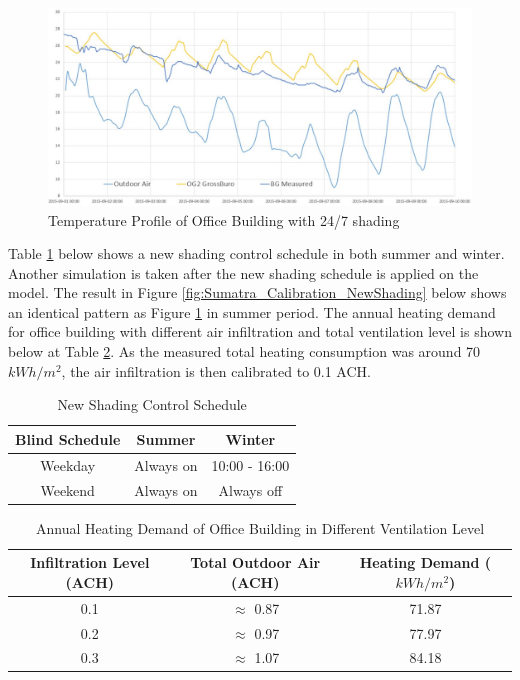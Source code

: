 \documentclass[a4paper, oneside]{discothesis}
\begin{document}
			\begin{figure}[h!]
			\centering
			\includegraphics[scale=0.3]{Sumatra_Calibration_AllonShading.JPG}
			\caption{Temperature Profile of Office Building with 24/7 shading}
			\label{fig:Sumatra_Calibration_Allshade}
			\end{figure}			
			
			Table \ref{tab:HonggShadingCtrl} below shows a new shading control schedule in both summer and winter. Another simulation is taken after the new shading schedule is applied on the model. The result in Figure \ref{fig:Sumatra_Calibration_NewShading} below shows an identical pattern as Figure \ref{fig:Sumatra_Calibration_Allshade} in summer period. The annual heating demand for office building with different air infiltration and total ventilation level is shown below at Table \ref{tab:SumatraVentLevel}. As the measured total heating consumption was around 70 $kWh/m^2$, the air infiltration is then calibrated to 0.1 ACH.\\
			
		\begin{table}[htbp]
		\centering
		\caption{New Shading Control Schedule}
		    \begin{tabular}{ccc}
		    \toprule
		    Blind Schedule & Summer & Winter\\
		    \midrule
            Weekday & Always on & 10:00 - 16:00 \\
            Weekend & Always on & Always off\\
		    \bottomrule
		    \end{tabular}%
		  \label{tab:HonggShadingCtrl}%
		\end{table}%
            
            
		\begin{table}[htbp]
		\centering
		\caption{Annual Heating Demand of Office Building in Different Ventilation Level}
		    \begin{tabular}{ccc}
		    \toprule
		    Infiltration Level (ACH) & Total Outdoor Air (ACH) & Heating Demand ($kWh/m^2$)\\
		    \midrule
            0.1 & $\approx$ 0.87 & 71.87\\
            0.2 & $\approx$ 0.97 & 77.97\\
            0.3 & $\approx$ 1.07 & 84.18\\
            
		    \bottomrule
		    \end{tabular}%
		  \label{tab:SumatraVentLevel}%
		\end{table}%
		
\end{document}
